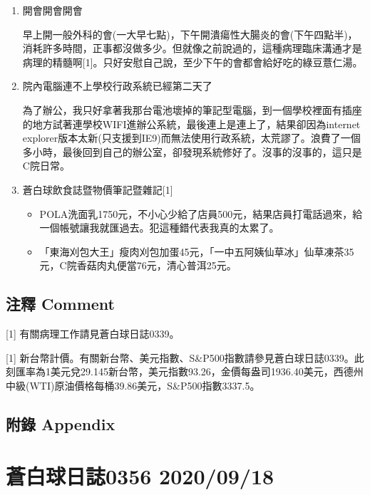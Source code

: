 \documentclass[a5paper, 11pt
]{book}
\providecommand{\tightlist}{%
  \setlength{\itemsep}{0pt}\setlength{\parskip}{0pt}}
\begin{document}
\begin{enumerate}
\def\labelenumi{\arabic{enumi}.}
\item
  開會開會開會

  早上開一般外科的會(一大早七點)，下午開潰瘍性大腸炎的會(下午四點半)，消耗許多時間，正事都沒做多少。但就像之前說過的，這種病理臨床溝通才是病理的精髓啊{[}1{]}。只好安慰自己說，至少下午的會都會給好吃的綠豆薏仁湯。
\item
  院內電腦連不上學校行政系統已經第二天了

  為了辦公，我只好拿著我那台電池壞掉的筆記型電腦，到一個學校裡面有插座的地方試著連學校WIFI進辦公系統，最後連上是連上了，結果卻因為internet
  explorer版本太新(只支援到IE9)而無法使用行政系統，太荒謬了。浪費了一個多小時，最後回到自己的辦公室，卻發現系統修好了。沒事的沒事的，這只是C院日常。
\item
  蒼白球飲食誌暨物價筆記暨雜記{[}1{]}

  \begin{itemize}
  \tightlist
  \item
    POLA洗面乳1750元，不小心少給了店員500元，結果店員打電話過來，給一個帳號讓我就匯過去。犯這種錯代表我真的太累了。
  \item
    「東海刈包大王」瘦肉刈包加蛋45元，「一中五阿姨仙草冰」仙草凍茶35元，C院香菇肉丸便當76元，清心普洱25元。
  \end{itemize}
\end{enumerate}

\hypertarget{ux6ce8ux91cb-comment-16}{%
\subsection{注釋 Comment}\label{ux6ce8ux91cb-comment-16}}

{[}1{]} 有關病理工作請見蒼白球日誌0339。

{[}1{]}
新台幣計價。有關新台幣、美元指數、S\&P500指數請參見蒼白球日誌0339。此刻匯率為1美元兌29.145新台幣，美元指數93.26，金價每盎司1936.40美元，西德州中級(WTI)原油價格每桶39.86美元，S\&P500指數3337.5。

\hypertarget{ux9644ux9304-appendix-16}{%
\subsection{附錄 Appendix}\label{ux9644ux9304-appendix-16}}

\hypertarget{ux84bcux767dux7403ux65e5ux8a8c0356-20200918}{%
\section{蒼白球日誌0356
2020/09/18}\label{ux84bcux767dux7403ux65e5ux8a8c0356-20200918}}
\end{document}
